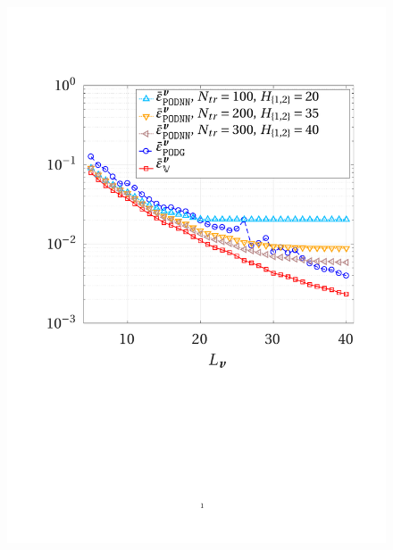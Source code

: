 \documentclass[12pt, a4paper, twoside, openright]{report}
\numberwithin{equation}{chapter}
\theoremstyle{theorem}
\theoremstyle{definition}
\theoremstyle{remark}
\theoremstyle{proposition}
\numberwithin{figure}{chapter}
\begin{document}
		\begin{figure}[H]
			\center
			\includegraphics[scale = 0.44, trim = {2cm 9cm 1.5cm 3.5cm}, clip]{dc_400_vel_error_vs_rank}

\end{figure}
\end{document}
